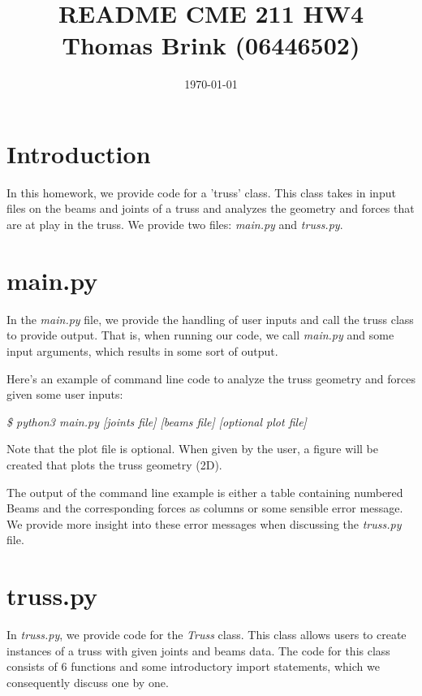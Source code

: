\documentclass[12pt, a4paper]{article}
\title{\textbf{README CME 211 HW4} \\ Thomas Brink (06446502)}
\date{\today}
\begin{document}
\maketitle

\section{Introduction}
In this homework, we provide code for a 'truss' class. This class takes
in input files on the beams and joints of a truss and analyzes the 
geometry and forces that are at play in the truss. We provide two
files: \textit{main.py} and \textit{truss.py}.

\section{main.py}
In the \textit{main.py} file, we provide the handling of user inputs and
call the truss class to provide output. That is, when running our code,
we call \textit{main.py} and some input arguments, which results in
some sort of output.

Here's an example of command line code to analyze the truss geometry
and forces given some user inputs:

\textit{\$ python3 main.py [joints file] [beams file] [optional plot file]}

Note that the plot file is optional. When given by the user, a figure
will be created that plots the truss geometry (2D). 

The output of the command line example is either a table containing
numbered Beams and the corresponding forces as columns or some
sensible error message. We provide more insight into these error
messages when discussing the \textit{truss.py} file. 

\section{truss.py}
In \textit{truss.py}, we provide code for the \textit{Truss} class.
This class allows users to create instances of a truss with given
joints and beams data. The code for this class consists of 6 functions
and some introductory import statements, which we consequently discuss
one by one.
\end{document}
